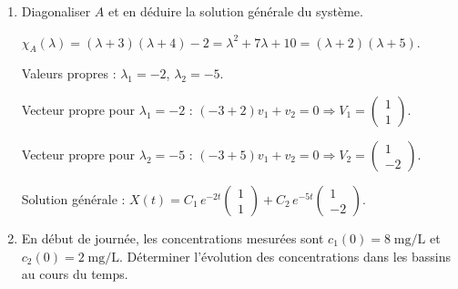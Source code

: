 \begin{enumerate}[itemsep=2em]
\begin{enumerate}[label=\alph*), itemsep=0.6em]
\begin{solution}
Bilan de masse sur le bassin~A (volume $V_A = 200$~m$^3$) : entrée de polluant depuis B par la recirculation ($Q\,c_2$), sorties vers B ($Q\,c_1$) et vers la station de traitement ($d_A\,c_1$, l'eau évacuée emporte le polluant à la concentration du bassin).
\[
V_A\, c_1' = \underbrace{Q\, c_2}_{\text{entrée depuis B}}
             - \underbrace{Q\, c_1}_{\text{sortie vers B}}
             - \underbrace{d_A\, c_1}_{\text{vidange vers la station}}.
\]
Soit $c_1' = \dfrac{Q}{V_A}(c_2 - c_1) - \dfrac{d_A}{V_A}\,c_1 = -\dfrac{Q + d_A}{V_A}\,c_1 + \dfrac{Q}{V_A}\,c_2 = -3\,c_1 + c_2$.

De même pour le bassin~B ($V_B = 100$~m$^3$) :
$c_2' = \dfrac{Q}{V_B}\,c_1 - \dfrac{Q + d_B}{V_B}\,c_2 = 2\,c_1 - 4\,c_2$.

D'où $A = \begin{pmatrix} -3 & 1 \\ 2 & -4 \end{pmatrix}$.
\end{solution}

  \item Diagonaliser $A$ et en déduire la solution générale du système.

\begin{solution}
$\chi_A(\lambda) = (\lambda+3)(\lambda+4) - 2 = \lambda^2 + 7\lambda + 10 = (\lambda+2)(\lambda+5)$.

Valeurs propres : $\lambda_1 = -2$, $\lambda_2 = -5$.

Vecteur propre pour $\lambda_1 = -2$ : $(-3+2)v_1 + v_2 = 0 \Rightarrow V_1 = \begin{pmatrix} 1 \\ 1 \end{pmatrix}$.

Vecteur propre pour $\lambda_2 = -5$ : $(-3+5)v_1 + v_2 = 0 \Rightarrow V_2 = \begin{pmatrix} 1 \\ -2 \end{pmatrix}$.

Solution générale : $X(t) = C_1\, e^{-2t}\begin{pmatrix} 1 \\ 1 \end{pmatrix} + C_2\, e^{-5t} \begin{pmatrix} 1 \\ -2 \end{pmatrix}$.
\end{solution}

  \item En début de journée, les concentrations mesurées sont $c_1(0) = 8\;\mathrm{mg/L}$ et $c_2(0) = 2\;\mathrm{mg/L}$. Déterminer l'évolution des concentrations dans les bassins au cours du temps.


\end{enumerate}
\end{enumerate}
